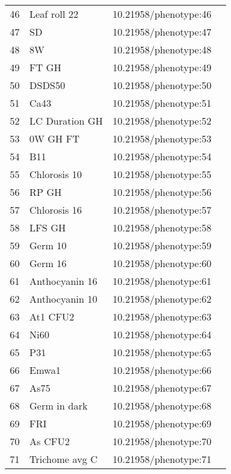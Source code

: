 \begin{longtable}{p{} p{} p{} p{}}
 46 & Leaf roll 22 & 10.21958/phenotype:46 & \cite{atwell2010}\\
 47 & SD & 10.21958/phenotype:47 & \cite{atwell2010}\\
 48 & 8W & 10.21958/phenotype:48 & \cite{atwell2010}\\
 49 & FT GH & 10.21958/phenotype:49 & \cite{atwell2010}\\
 50 & DSDS50 & 10.21958/phenotype:50 & \cite{atwell2010}\\
 51 & Ca43 & 10.21958/phenotype:51 & \cite{atwell2010}\\
 52 & LC Duration GH & 10.21958/phenotype:52 & \cite{atwell2010}\\
 53 & 0W GH FT & 10.21958/phenotype:53 & \cite{atwell2010}\\
 54 & B11 & 10.21958/phenotype:54 & \cite{atwell2010}\\
 55 & Chlorosis 10 & 10.21958/phenotype:55 & \cite{atwell2010}\\
 56 & RP GH & 10.21958/phenotype:56 & \cite{atwell2010}\\
 57 & Chlorosis 16 & 10.21958/phenotype:57 & \cite{atwell2010}\\
 58 & LFS GH & 10.21958/phenotype:58 & \cite{atwell2010}\\
 59 & Germ 10 & 10.21958/phenotype:59 & \cite{atwell2010}\\
 60 & Germ 16 & 10.21958/phenotype:60 & \cite{atwell2010}\\
 61 & Anthocyanin 16 & 10.21958/phenotype:61 & \cite{atwell2010}\\
 62 & Anthocyanin 10 & 10.21958/phenotype:62 & \cite{atwell2010}\\
 63 & At1 CFU2 & 10.21958/phenotype:63 & \cite{atwell2010}\\
 64 & Ni60 & 10.21958/phenotype:64 & \cite{atwell2010}\\
 65 & P31 & 10.21958/phenotype:65 & \cite{atwell2010}\\
 66 & Emwa1 & 10.21958/phenotype:66 & \cite{atwell2010}\\
 67 & As75 & 10.21958/phenotype:67 & \cite{atwell2010}\\
 68 & Germ in dark & 10.21958/phenotype:68 & \cite{atwell2010}\\
 69 & FRI & 10.21958/phenotype:69 & \cite{atwell2010}\\
 70 & As CFU2 & 10.21958/phenotype:70 & \cite{atwell2010}\\
 71 & Trichome avg C & 10.21958/phenotype:71 & \cite{atwell2010}\\

\end{longtable}
